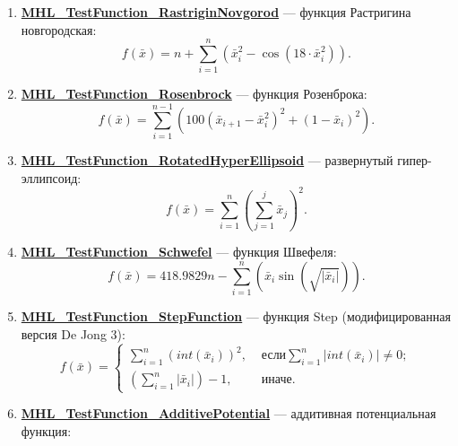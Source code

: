 \begin{enumerate}
 \item \hyperref[TestFunctions:section:MHL_TestFunction_RastriginNovgorod]{\textbf{MHL\_TestFunction\_RastriginNovgorod}} --- функция Растригина новгородская:
 \begin{equation}
 f\left( \bar{x}\right) = n+\sum_{i=1}^{n}\left( \bar{x}_i^2-\cos\left(18\cdot \bar{x}_i^2\right) \right).
 \end{equation}
 \item \hyperref[TestFunctions:section:MHL_TestFunction_Rosenbrock]{\textbf{MHL\_TestFunction\_Rosenbrock}} --- функция Розенброка:
 \begin{equation}
 f\left( \bar{x}\right) = \sum_{i=1}^{n-1} \left( 100{\left( \bar{x}_{i+1}-\bar{x}_i^2\right)}^2+{\left( 1-\bar{x}_i\right) }^2 \right).
 \end{equation}
 \item \hyperref[TestFunctions:section:MHL_TestFunction_RotatedHyperEllipsoid]{\textbf{MHL\_TestFunction\_RotatedHyperEllipsoid}} --- развернутый гипер-эллипсоид:
 \begin{equation}
 f\left( \bar{x}\right) = \sum_{i=1}^{n}\left( \sum_{j=1}^{j}\bar{x}_j\right) ^2.
 \end{equation}
 \item \hyperref[TestFunctions:section:MHL_TestFunction_Schwefel]{\textbf{MHL\_TestFunction\_Schwefel}} --- функция Швефеля:
 \begin{equation}
 f\left( \bar{x}\right) = 418.9829 n-\sum_{i=1}^{n}\left( \bar{x}_i\sin\left( \sqrt{\left| \bar{x}_i\right|}\right)  \right).
 \end{equation}
 \item \hyperref[TestFunctions:section:MHL_TestFunction_StepFunction]{\textbf{MHL\_TestFunction\_StepFunction}} --- функция Step (модифицированная версия De Jong 3):
 \begin{equation}
 f\left( \bar{x}\right) =\left\lbrace \begin{aligned}
 \sum_{i=1}^{n} \left( int\left( \bar{x}_{i}\right)  \right)^2,& \text{ если} \sum_{i=1}^{n} \left| int\left( \bar{x}_{i}\right)\right| \neq 0 ;\\ \left( \sum_{i=1}^{n} \left| \bar{x}_{i}\right|\right) -1 ,& \text{ иначе}.
 \end{aligned}\right.
 \end{equation}
 \item \hyperref[TestFunctions:section:MHL_TestFunction_AdditivePotential]{\textbf{MHL\_TestFunction\_AdditivePotential}} --- аддитивная потенциальная функция:
 \begin{equation}

\end{equation}
\end{enumerate}
